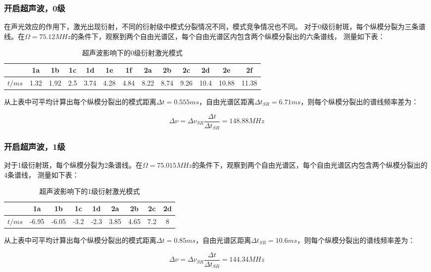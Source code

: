 \documentclass[12pt,a4paper]{article}
\newcommand{\be}[1]{
    \begin{equation}
        #1
    \end{equation}
}
\begin{document}
\subsubsection{开启超声波，0级}
在声光效应的作用下，激光出现衍射，不同的衍射级中模式分裂情况不同，模式竞争情况也不同。
对于0级衍射斑，每个纵模分裂为三条谱线。在$\Omega=75.12MHz$的条件下，观察到两个自由光谱区，每个自由光谱区内包含两个纵模分裂出的六条谱线，
测量如下表：
\begin{table}[H]
    \centering
    \begin{tabular}{|c|c|c|c|c|c|c|c|c|c|c|c|c|}
    \hline
      & 1a   & 1b   & 1c  & 1d   & 1e   & 1f   & 2a   & 2b   & 2c   & 2d   & 2e    & 2f    \\ \hline
    $t/ms$ & 1.32 & 1.92 & 2.5 & 3.74 & 4.28 & 4.84 & 8.22 & 8.74 & 9.26 & 10.4 & 10.88 & 11.38 \\ \hline
    \end{tabular}
    \caption{超声波影响下的0级衍射激光模式}
    \end{table}
    从上表中可平均计算出每个纵模分裂出的模式距离$\Delta t=0.555ms$，自由光谱区距离$\Delta t_{SR}=6.71ms$，则每个纵模分裂出的谱线频率差为：
    \be{\Delta \nu=\Delta \nu_{SR}\frac{\Delta t}{\Delta t_{SR}}=148.88MHz}
\subsubsection{开启超声波，1级}
对于1级衍射斑，每个纵模分裂为2条谱线。在$\Omega=75.015MHz$的条件下，观察到两个自由光谱区，每个自由光谱区内包含两个纵模分裂出的4条谱线，
测量如下表：
\begin{table}[H]
    \centering
    \begin{tabular}{|c|c|c|c|c|c|c|c|c|}
    \hline
      & 1a    & 1b    & 1c   & 1d   & 2a   & 2b   & 2c  & 2d \\ \hline
    $t/ms$ & -6.95 & -6.05 & -3.2 & -2.3 & 3.85 & 4.65 & 7.2 & 8  \\ \hline
    \end{tabular}
    \caption{超声波影响下的1级衍射激光模式}
    \end{table}
    从上表中可平均计算出每个纵模分裂出的模式距离$\Delta t=0.85ms$，自由光谱区距离$\Delta t_{SR}=10.6ms$，则每个纵模分裂出的谱线频率差为：
    \be{\Delta \nu=\Delta \nu_{SR}\frac{\Delta t}{\Delta t_{SR}}=144.34MHz}
\end{document}
